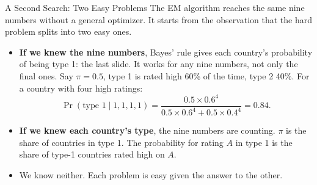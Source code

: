 \documentclass[aspectratio=169,11pt,xcolor=dvipsnames]{beamer}
\begin{document}
\begin{frame}{A Second Search: Two Easy Problems}
The EM algorithm reaches the same nine numbers without a general optimizer. It starts from the
observation that the hard problem splits into two easy ones.
\begin{itemize}\itemsep5pt
  \item \textbf{If we knew the nine numbers}, Bayes' rule gives each country's probability of being
        type 1: the last slide. It works for any nine numbers, not only the final ones. Say
        $\pi = 0.5$, type 1 is rated high 60\% of the time, type 2 40\%. For a country with four
        high ratings:
        \[ \Pr(\text{type 1} \mid 1,1,1,1) =
           \frac{0.5 \times 0.6^4}{0.5 \times 0.6^4 + 0.5 \times 0.4^4} = 0.84 . \]
  \item \textbf{If we knew each country's type}, the nine numbers are counting. $\pi$ is the share
        of countries in type 1. The probability for rating $A$ in type 1 is the share of type-1
        countries rated high on $A$.
  \item We know neither. Each problem is easy given the answer to the other.
\end{itemize}
\end{frame}
\end{document}
